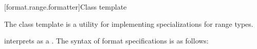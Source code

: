 \documentclass{wg21}
\begin{document}
\begin{example}
%
\end{example}

\ednote{[...]}


[format.range.formatter]{Class template }

\pnum
The class template  is a utility
for implementing  specializations for range types.

\pnum
{} interprets 
as a .
The syntax of format specifications is as follows:

\begin{ncbnf}
    \br
        
\end{ncbnf}
\end{document}
